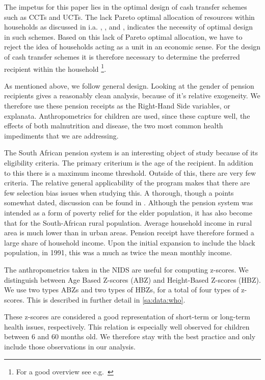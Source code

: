 \begin{refsection}
The impetus for this paper lies in the optimal design of cash transfer schemes such as CCTs and UCTs.
The lack Pareto optimal allocation of resources within households as discussed in i.a.
\textcite{udry1995gender}, \textcite{udry1996gender}, and \textcite{duflo2004intrahousehold},
indicates the necessity of optimal design in such schemes.
Based on this lack of Pareto optimal allocation,
we have to reject the idea of households acting as a unit in an economic sense.
For the design of cash transfer schemes it is therefore necessary to determine the preferred recipient within the household
\footnote{For a good overview see e.g.~\textcite{haddad1997intrahousehold}}.

As mentioned above, we follow \textcite{duflo2000child,duflo2003grandmothers} general design.
Looking at the gender of pension recipients gives a reasonably clean analysis,
because of it's relative exogeneity.
We therefore use these pension receipts as the Right-Hand Side variables, or explanata.
Anthropometrics for children are used, since these capture well, the effects of both malnutrition and disease,
the two most common health impediments that we are addressing.

The South African pension system is an interesting object of study because of its eligibility criteria.
The primary criterium is the age of the recipient.
In addition to this there is a maximum income threshold.
Outside of this, there are very few criteria.
The relative general applicability of the program makes that there are few selection bias issues when studying this.
A thorough, though a points somewhat dated, discussion can be found in \textcite{case1998large}.
Although the pension system was intended as a form of poverty relief for the elder population,
it has also become that for the South-African rural population\parencite{tangwe2013impact}.
Average household income in rural area is much lower than in urban areas.
Pension receipt have therefore formed a large share of household income.
Upon the initial expansion to include the black population, in 1991,
this was a much as twice the mean monthly income.

The anthropometrics taken in the NIDS are useful for computing z-scores.
We distinguish between Age Based Z-scores (ABZ) and Height-Based Z-scores (HBZ).
We use two types ABZs and two types of HBZs, for a total of four types of z-scores.
This is described in further detail in \autoref{sa:data:who}.

These z-scores are considered a good representation of short-term or long-term health issues, respectively.
This relation is especially well observed for children between 6 and 60 months old.
We therefore stay with the best practice and only include those observations in our analysis.


\end{refsection}
